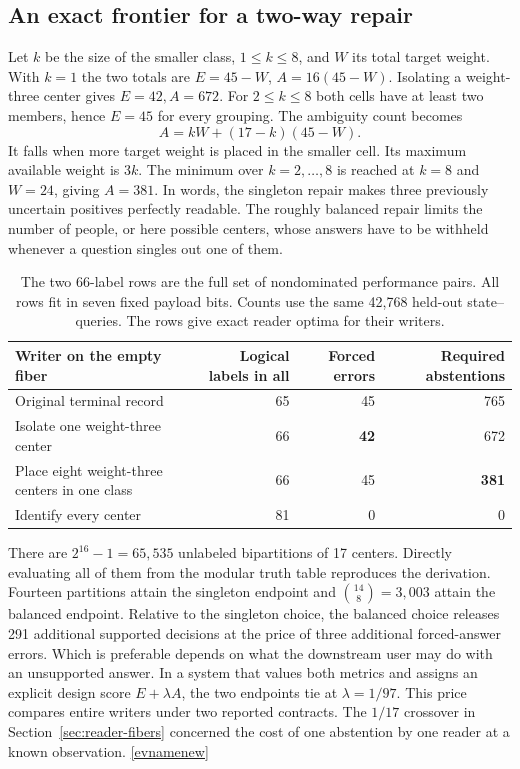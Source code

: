 \documentclass[11pt,letterpaper]{article}
\newcommand{\evref}[1]{\hyperlink{ev-#1}{\textsf{\small[\csname evname#1\endcsname]}}}
\begin{document}
\subsection{An exact frontier for a two-way repair}
Let \(k\) be the size of the smaller class, \(1\le k\le8\), and \(W\) its total target weight. With \(k=1\) the two totals are \(E=45-W\), \(A=16(45-W)\). Isolating a weight-three center gives \(E=42,A=672\). For \(2\le k\le8\) both cells have at least two members, hence \(E=45\) for every grouping. The ambiguity count becomes
\[
 A=kW+(17-k)(45-W).
\]
It falls when more target weight is placed in the smaller cell. Its maximum available weight is \(3k\). The minimum over \(k=2,\ldots,8\) is reached at \(k=8\) and \(W=24\), giving \(A=381\). In words, the singleton repair makes three previously uncertain positives perfectly readable. The roughly balanced repair limits the number of people, or here possible centers, whose answers have to be withheld whenever a question singles out one of them.

\begin{table}[htbp]\centering\small
\begin{tabularx}{\linewidth}{@{}Yrrr@{}}
\toprule
Writer on the empty fiber & Logical labels in all & Forced errors & Required abstentions\\\midrule
Original terminal record & 65 & 45 & 765\\
Isolate one weight-three center & 66 & \textbf{42} & 672\\
Place eight weight-three centers in one class & 66 & 45 & \textbf{381}\\
Identify every center & 81 & 0 & 0\\
\bottomrule
\end{tabularx}
\caption{The two 66-label rows are the full set of nondominated performance pairs. All rows fit in seven fixed payload bits. Counts use the same 42,768 held-out state–queries. The rows give exact reader optima for their writers.}
\label{tab:refine}
\end{table}

There are \(2^{16}-1=65{,}535\) unlabeled bipartitions of 17 centers. Directly evaluating all of them from the modular truth table reproduces the derivation. Fourteen partitions attain the singleton endpoint and \(\binom{14}{8}=3{,}003\) attain the balanced endpoint. Relative to the singleton choice, the balanced choice releases 291 additional supported decisions at the price of three additional forced-answer errors. Which is preferable depends on what the downstream user may do with an unsupported answer. In a system that values both metrics and assigns an explicit design score \(E+\lambda A\), the two endpoints tie at \(\lambda=1/97\). This price compares entire writers under two reported contracts. The \(1/17\) crossover in Section~\ref{sec:reader-fibers} concerned the cost of one abstention by one reader at a known observation. \evref{new}
\end{document}
